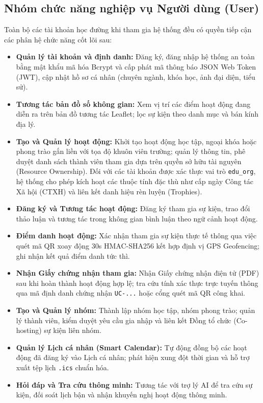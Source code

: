 \subsection{Nhóm chức năng nghiệp vụ Người dùng (User)}

Toàn bộ các tài khoản học đường khi tham gia hệ thống đều có quyền tiếp cận các phân hệ chức năng cốt lõi sau:

\begin{itemize}
    \item \textbf{Quản lý tài khoản và định danh:} Đăng ký, đăng nhập hệ thống an toàn bằng mật khẩu mã hóa Bcrypt và cấp phát mã thông báo JSON Web Token (JWT), cập nhật hồ sơ cá nhân (chuyên ngành, khóa học, ảnh đại diện, tiểu sử).

    \item \textbf{Tương tác bản đồ số không gian:} Xem vị trí các điểm hoạt động đang diễn ra trên bản đồ tương tác Leaflet; lọc sự kiện theo danh mục và bán kính địa lý.
    
    \item \textbf{Tạo và Quản lý hoạt động:} Khởi tạo hoạt động học tập, ngoại khóa hoặc phong trào gắn liền với tọa độ khuôn viên trường; quản lý thông tin, phê duyệt danh sách thành viên tham gia dựa trên quyền sở hữu tài nguyên (Resource Ownership). Đối với các tài khoản được xác thực vai trò \texttt{edu\_org}, hệ thống cho phép kích hoạt các thuộc tính đặc thù như cấp ngày Công tác Xã hội (CTXH) và liên kết danh hiệu rèn luyện (Trophies).
    
    \item \textbf{Đăng ký và Tương tác hoạt động:} Đăng ký tham gia sự kiện, trao đổi thảo luận và tương tác trong không gian bình luận theo ngữ cảnh hoạt động.
    
    \item \textbf{Điểm danh hoạt động:} Xác nhận tham gia sự kiện thực tế thông qua việc quét mã QR xoay động 30s HMAC-SHA256 kết hợp định vị GPS Geofencing; ghi nhận kết quả điểm danh tức thì.
    
    \item \textbf{Nhận Giấy chứng nhận tham gia:} Nhận Giấy chứng nhận điện tử (PDF) sau khi hoàn thành hoạt động hợp lệ; tra cứu tính xác thực trực tuyến thông qua mã định danh chứng nhận \texttt{UC-...} hoặc cổng quét mã QR công khai.
    
    \item \textbf{Tạo và Quản lý nhóm:} Thành lập nhóm học tập, nhóm phong trào; quản lý thành viên, kiểm duyệt yêu cầu gia nhập và liên kết Đồng tổ chức (Co-hosting) sự kiện liên nhóm.
    
    \item \textbf{Quản lý Lịch cá nhân (Smart Calendar):} Tự động đồng bộ các hoạt động đã đăng ký vào Lịch cá nhân; phát hiện xung đột thời gian và hỗ trợ xuất tệp lịch \texttt{.ics} chuẩn hóa.
    
    \item \textbf{Hỏi đáp và Tra cứu thông minh:} Tương tác với trợ lý AI để tra cứu sự kiện, đối soát lịch bận và nhận khuyến nghị hoạt động thông minh.
\end{itemize}


